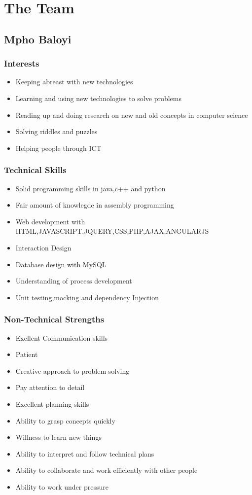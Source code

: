 \documentclass[a4paper,12pt]{article}
\begin{document}
\newpage

\section{The Team}
\subsection{Mpho Baloyi}
\subsubsection{Interests}
\begin{itemize}
\item Keeping abreast with new technologies
\item Learning and using new technologies to solve problems
\item Reading up and doing research on new and old concepts in computer science
\item Solving riddles and puzzles
\item Helping people through ICT
\end{itemize}
\subsubsection{Technical Skills}
\begin{itemize}
\item Solid programming skills in java,c++ and python
\item Fair amount of knowlegde in assembly programming
\item Web development with HTML,JAVASCRIPT,JQUERY,CSS,PHP,AJAX,ANGULARJS
\item Interaction Design
\item Database design with MySQL
\item Understanding of process development
\item Unit testing,mocking and dependency Injection
\end{itemize}
\subsubsection{Non-Technical Strengths}
\begin{itemize}
\item Exellent Communication skills
\item Patient
\item Creative approach to problem solving
\item Pay attention to detail
\item Excellent planning skills
\item Ability to grasp concepts quickly
\item Willness to learn new things
\item Ability to interpret and follow technical plans
\item Ability to collaborate and work efficiently with other people
\item Ability to work under pressure
\end{itemize}
\end{document}
